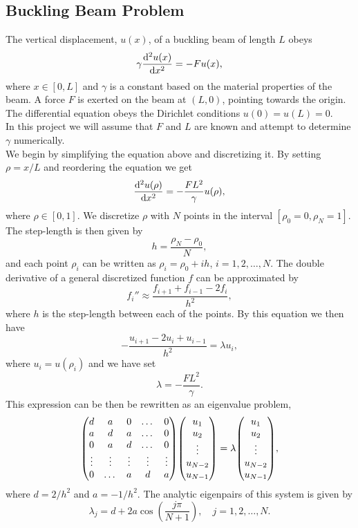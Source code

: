 \documentclass[notitlepage, reprint, nofootinbib]{revtex4-1}
\begin{document}
\subsection{Buckling Beam Problem}
The vertical displacement, $u(x)$, of a buckling beam of length $L$ obeys 
\begin{equation}\label{bb1}\gamma\dv[2]{u(x)}{x}=-Fu(x),\end{equation}
where $x\in [0,L]$ and $\gamma$ is a constant based on the material properties of the beam. A force $F$ is exerted on the beam at $(L,0)$, pointing towards the origin. The differential equation obeys the Dirichlet conditions $u(0)=u(L)=0$.\\[2mm]
In this project we will assume that $F$ and $L$ are known and attempt to determine $\gamma$ numerically.\\[2mm]
We begin by simplifying the equation above and discretizing it. By setting $\rho = x/L$ and reordering the equation we get 
$$\dv[2]{u(\rho)}{x}=-\frac{FL^2}{\gamma}u(\rho),$$
where $\rho \in [0,1]$. We discretize $\rho$ with $N$ points in the interval $[\rho_0 = 0, \rho_N=1]$. The step-length is then given by 
$$h = \frac{\rho_N-\rho_0}{N},$$
and each point $\rho_i$ can be written as $\rho_i=\rho_0 + ih$, $i=1,2,\dots,N$. The double derivative of a general discretized function $f$ can be approximated by 
\begin{equation}\label{double_deriv}f_i'' \approx \frac{f_{i+1} + f_{i-1}-2f_i}{h^2},\end{equation}
where $h$ is the step-length between each of the points. By this equation we then have 
\begin{equation}\label{bb2}-\frac{u_{i+1}-2u_i+u_{i-1}}{h^2}=\lambda u_i, \end{equation}
where $u_i = u(\rho_i)$ and we have set 
\begin{equation}\label{FL}\lambda=-\frac{FL^2}{\gamma}.\end{equation}
This expression can be then be rewritten as an eigenvalue problem,
\begin{equation}\label{big_boi}\mqty (d&a&0&\dots&0\\a&d&a&\dots&0\\ 0&a&d&\dots&0\\ \vdots&\vdots&\vdots&\vdots&\vdots \\ 0 &\dots&a&d&a) \mqty(u_1\\u_2\\ \vdots\\ u_{N-2}\\u_{N-1})=\lambda \mqty(u_1\\u_2\\ \vdots\\ u_{N-2}\\u_{N-1}),\end{equation}
where $d=2/h^2$ and $a=-1/h^2$. The analytic eigenpairs of this system is given by 
\begin{equation}\label{eigenpairs}\lambda_j = d+2a\cos(\frac{j\pi}{N+1}),\quad j=1,2,\dots,N.\end{equation}
\newpage
\end{document}
